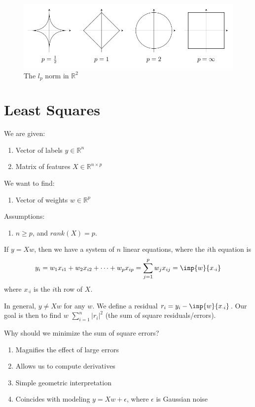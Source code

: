 \documentclass[12pt]{article}
\theoremstyle{definition}
\newcommand{\e}{\epsilon}
\newcommand{\R}{\mathbb{R}}
\begin{document}
\begin{figure}[H]
	\begin{center}
		\includegraphics[scale=.5]{norm_ball.png}
	\end{center}
	\caption{The $l_p$ norm in $\R^2$}
\end{figure}

\section{Least Squares}
We are given:
\begin{enumerate}
	\item Vector of labels $y \in \R^n$ 
	\item Matrix of features $X \in \R^{n \times p}$
\end{enumerate}

We want to find:
\begin{enumerate}
	\item Vector of weights $w \in \R^p$
\end{enumerate}

Assumptions:
\begin{enumerate}
	\item $n \geq p$, and $rank(X) = p$. 
\end{enumerate}

If $y = Xw$, then we have a system of $n$ linear equations, where the $i$th equation is
\begin{equation}
	y_i = w_1 x_{i1} + w_2 x_{i2} + \cdots + w_p x_{ip} = \sum_{j=1}^p w_j x_{ij} = \inp{w}{x_{\cdot i}}
\end{equation}
where $x_{\cdot i}$ is the $i$th row of $X$. 

In general, $y \neq Xw$ for any $w$. We define a residual $r_i = y_i - \inp{w}{x_{\cdot i}}$. Our goal is then to find $w$
$\sum_{i=1}^n |r_i|^2$ (the sum of square residuals/errors). 

Why should we minimize the sum of square errors?
\begin{enumerate}
	\item Magnifies the effect of large errors
	\item Allows us to compute derivatives
	\item Simple geometric interpretation
	\item Coincides with modeling $y = Xw + \e$, where $\e $ is Gaussian noise
\end{enumerate}
\end{document}
